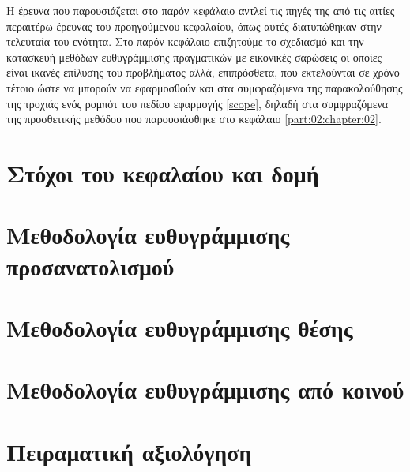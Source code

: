 Η έρευνα που παρουσιάζεται στο παρόν κεφάλαιο αντλεί τις πηγές της από τις
αιτίες περαιτέρω έρευνας του προηγούμενου κεφαλαίου, όπως αυτές διατυπώθηκαν
στην τελευταία του ενότητα. Στο παρόν κεφάλαιο επιζητούμε το σχεδιασμό και την
κατασκευή μεθόδων ευθυγράμμισης πραγματικών με εικονικές σαρώσεις οι οποίες
είναι ικανές επίλυσης του προβλήματος αλλά, επιπρόσθετα, που εκτελούνται σε
χρόνο τέτοιο ώστε να μπορούν να εφαρμοσθούν και στα συμφραζόμενα της
παρακολούθησης της τροχιάς ενός ρομπότ του πεδίου εφαρμογής \ref{scope}, δηλαδή
στα συμφραζόμενα της προσθετικής μεθόδου που παρουσιάσθηκε στο κεφάλαιο
\ref{part:02:chapter:02}.

\section{Στόχοι του κεφαλαίου και δομή}
  \label{section:02_04_01}
  

\section{Μεθοδολογία ευθυγράμμισης προσανατολισμού}
  \label{section:02_04_02}
  

\section{Μεθοδολογία ευθυγράμμισης θέσης}
  \label{section:02_04_03}
  

\section{Μεθοδολογία ευθυγράμμισης από κοινού}
  \label{section:02_04_04}
  

\section{Πειραματική αξιολόγηση}
  \label{section:02_04_05}
  

